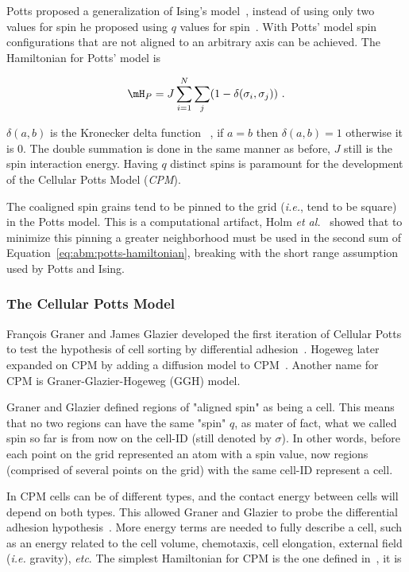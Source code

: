 Potts proposed a generalization of Ising's model~\cite{potts1952some}, instead of using only two values for spin he proposed using $q$ values for spin~\cite{potts1952some}. With Potts' model spin configurations that are not aligned to an arbitrary axis can be achieved. The Hamiltonian for Potts' model is

\begin{equation}\label{eq:abm:potts-hamiltonian}
    \mH_P = J \sum_{i=1}^{N}\sum_{j} ( 1 - \delta(\sigma_i,\sigma_j))\,\,.
\end{equation}

\noindent $\delta(a, b)$ is the Kronecker delta function~\cite{} %
, if $a=b$ then $\delta(a, b)=1$ otherwise it is 0. The double summation is done in the same manner as before, $J$ still is the spin interaction energy. Having $q$ distinct spins is paramount for the development of the Cellular Potts Model (\textit{CPM}).

The coaligned spin grains tend to be pinned to the grid (\textit{i.e.}, tend to be square) in the Potts model. This is a computational artifact, Holm \textit{et al.}~\cite{holm1991effects} showed that to minimize this pinning a greater neighborhood must be used in the second sum of Equation~\ref{eq:abm:potts-hamiltonian}, breaking with the short range assumption used by Potts and Ising.

\subsubsection{The Cellular Potts Model}\label{sec:abm:apm-history:cpm}

François Graner and James Glazier developed the first iteration of Cellular Potts to test the hypothesis of cell sorting by differential adhesion~\cite{graner1992simulation}. Hogeweg later expanded on CPM by adding a diffusion model to CPM~\cite{savill_modelling_1997}. Another name for CPM is Graner-Glazier-Hogeweg (GGH) model.

Graner and Glazier defined regions of "aligned spin" as being a cell. This means that no two regions can have the same "spin" $q$, as mater of fact, what we called spin so far is from now on the cell-ID (still denoted by $\sigma$). In other words, before each point on the grid represented an atom with a spin value, now regions (comprised of several points on the grid) with the same cell-ID represent a cell.

In CPM cells can be of different types, and the contact energy between cells will depend on both types. This allowed Graner and Glazier to probe the differential adhesion hypothesis~\cite{graner1992simulation}. More energy terms are needed to fully describe a cell, such as an energy related to the cell volume, chemotaxis, cell elongation, external field (\textit{i.e.} gravity), \textit{etc}. The simplest Hamiltonian for CPM is the one defined in~\cite{graner1992simulation}, it is

